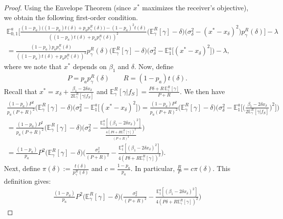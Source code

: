 \documentclass[11pt,dvipsnames]{article}
\begin{document}
\begin{appendix}
\begin{proof}
Using the Envelope Theorem (since $x^*$ maximizes the receiver's objective), we obtain the following first-order condition.
\begin{align*}
\mathbb{E}_{0,1}^a\bigg[\frac{(1-p_a)\big((1-p_a)t(\delta)+p_ap_\gamma^R(\delta)\big)-(1-p_a)^2t(\delta)}{((1-p_a)t(\delta)+p_ap_\gamma^R(\delta))^2}\big(\mathbb{E}_\gamma^R[\gamma]-\delta\big)\big(\sigma_\delta^2-(x^*-x_\delta)^2\big)p_\gamma^R(\delta)\bigg]-\lambda
\\
=\frac{(1-p_a)p_ap_\gamma^R(\delta)}{((1-p_a)t(\delta)+p_ap_\gamma^R(\delta))^2}p_\gamma^R(\delta)\big(\mathbb{E}_\gamma^R[\gamma]-\delta\big)\big(\sigma_\delta^2-\mathbb{E}_1^a\big[(x^*-x_\delta)^2\big]\big)	- \lambda,
\end{align*}
where we note that $x^*$ depends on $\beta_1$ and $\delta$.
Now, define
\begin{align*}
P = p_ap_\gamma^R(\delta)
\qquad
R = (1-p_a)t(\delta).	
\end{align*}
Recall that $x^* = x_\delta + \frac{\beta_1-2\delta x_\delta}{2\mathbb{E}_\gamma^R[\gamma|f_S]}$ and $\mathbb{E}_\gamma^R[\gamma|f_S] = \frac{P\delta+R\,\mathbb{E}_\gamma^R[\gamma]}{P+R}$.
We then have
\begin{align*}
\frac{(1-p_a)P^2}{p_a(P+R)^2}\big(\mathbb{E}_\gamma^R[\gamma]-\delta\big)\big(\sigma_\delta^2-\mathbb{E}_1^a\big[(x^*-x_\delta)^2\big]\big)
= \frac{(1-p_a)P^2}{p_a(P+R)^2}\big(\mathbb{E}_\gamma^R[\gamma]-\delta\big)\big(\sigma_\delta^2
-\mathbb{E}_1^a\big[\big(\frac{\beta_1-2\delta x_\delta}{2\mathbb{E}_\gamma^R[\gamma|f_S]}\big)^2\big]\big) 
\\
= \frac{(1-p_a)P^2}{p_a(P+R)^2}\big(\mathbb{E}_\gamma^R[\gamma]-\delta\big)\big(\sigma_\delta^2
-\frac{\mathbb{E}_1^a[(\beta_1-2\delta x_\delta)^2]}{\frac{4(P\delta + R\mathbb{E}_\gamma^R[\gamma])^2}{(P+R)^2}}\big) 
\\
= \frac{(1-p_a)}{p_a}P^2\big(\mathbb{E}_\gamma^R[\gamma]-\delta\big)
\big(\frac{\sigma_\delta^2}{(P+R)^2}
-\frac{\mathbb{E}_1^a[(\beta_1-2\delta x_\delta)^2]}{4(P\delta + R\mathbb{E}_\gamma^R[\gamma])^2}\big). 
\end{align*}
Next, define $\pi(\delta):=\frac{t(\delta)}{p_\gamma^R(\delta)}$ and $c = \frac{1-p_a}{p_a}$.
In particular, $\frac{R}{P} = c\pi(\delta)$.
This definition gives:
\begin{align*}
\frac{(1-p_a)}{p_a}P^2\big(\mathbb{E}_\gamma^R[\gamma]-\delta\big)
\big(\frac{\sigma_\delta^2}{(P+R)^2}
-\frac{\mathbb{E}_1^a[(\beta_1-2\delta x_\delta)^2]}{4(P\delta + R\mathbb{E}_\gamma^R[\gamma])^2}\big)

\end{align*}
\end{proof}
\end{appendix}
\end{document}
